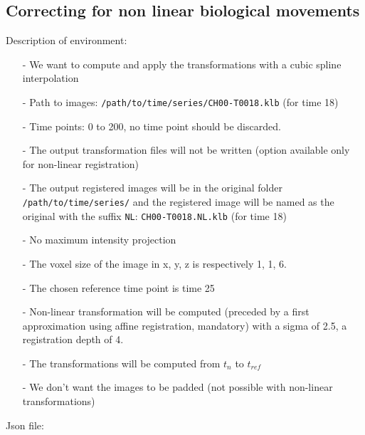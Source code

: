 \documentclass[10pt,a4paper]{article}
\begin{document}
\subsection{Correcting for non linear biological movements}
Description of environment:
\begin{itemize}
\item[-] We want to compute and apply the transformations with a cubic spline interpolation
\item[-] Path to images: \texttt{/path/to/time/series/CH00-T0018.klb} (for time 18)
\item[-] Time points: 0 to 200, no time point should be discarded.
\item[-] The output transformation files will not be written (option available only for non-linear registration)
\item[-] The output registered images will be in the original folder \texttt{/path/to/time/series/} and the registered image will be named as the original with the suffix \texttt{NL}: \texttt{CH00-T0018.NL.klb} (for time 18)
\item[-] No maximum intensity projection
\item[-] The voxel size of the image in x, y, z is respectively 1, 1, 6.
\item[-] The chosen reference time point is time 25
\item[-] Non-linear transformation will be computed (preceded by a first approximation using affine registration, mandatory) with a sigma of 2.5, a registration depth of 4.
\item[-] The transformations will be computed from $t_n$ to $t_{ref}$
\item[-] We don't want the images to be padded (not possible with non-linear transformations)
\end{itemize}
Json file:
\end{document}
